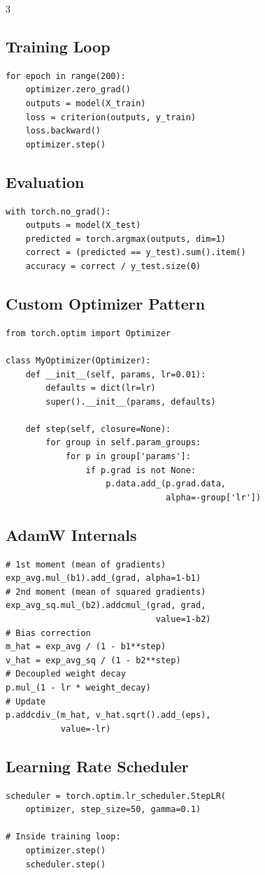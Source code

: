 \documentclass[6pt,landscape,a4paper]{extarticle}
\begin{document}
\begin{multicols}{3}
\subsection{Training Loop}
\begin{lstlisting}
for epoch in range(200):
    optimizer.zero_grad()
    outputs = model(X_train)
    loss = criterion(outputs, y_train)
    loss.backward()
    optimizer.step()
\end{lstlisting}

\subsection{Evaluation}
\begin{lstlisting}
with torch.no_grad():
    outputs = model(X_test)
    predicted = torch.argmax(outputs, dim=1)
    correct = (predicted == y_test).sum().item()
    accuracy = correct / y_test.size(0)
\end{lstlisting}

\subsection{Custom Optimizer Pattern}
\begin{lstlisting}
from torch.optim import Optimizer

class MyOptimizer(Optimizer):
    def __init__(self, params, lr=0.01):
        defaults = dict(lr=lr)
        super().__init__(params, defaults)

    def step(self, closure=None):
        for group in self.param_groups:
            for p in group['params']:
                if p.grad is not None:
                    p.data.add_(p.grad.data,
                                alpha=-group['lr'])
\end{lstlisting}

\subsection{AdamW Internals}
\begin{lstlisting}
# 1st moment (mean of gradients)
exp_avg.mul_(b1).add_(grad, alpha=1-b1)
# 2nd moment (mean of squared gradients)
exp_avg_sq.mul_(b2).addcmul_(grad, grad,
                              value=1-b2)
# Bias correction
m_hat = exp_avg / (1 - b1**step)
v_hat = exp_avg_sq / (1 - b2**step)
# Decoupled weight decay
p.mul_(1 - lr * weight_decay)
# Update
p.addcdiv_(m_hat, v_hat.sqrt().add_(eps),
           value=-lr)
\end{lstlisting}

\subsection{Learning Rate Scheduler}
\begin{lstlisting}
scheduler = torch.optim.lr_scheduler.StepLR(
    optimizer, step_size=50, gamma=0.1)

# Inside training loop:
    optimizer.step()
    scheduler.step()
\end{lstlisting}

\end{multicols}
\end{document}
